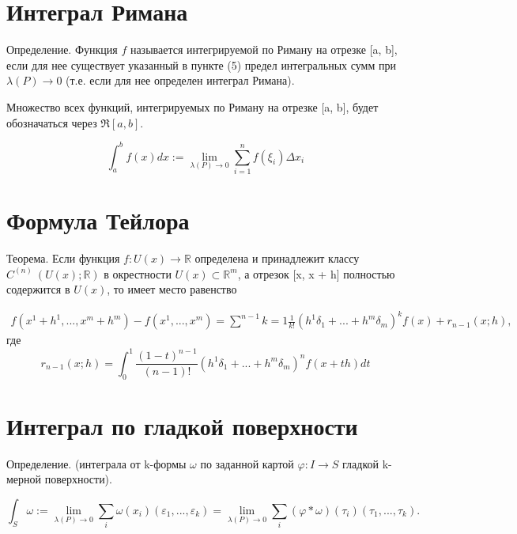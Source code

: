 \documentclass[a4paper, 12pt]{extarticle} %
\begin{document}
\clearpage

\section*{Интеграл Римана}

Определение. Функция $f$ называется интегрируемой по Риману на отрезке [a, b], если для нее существует указанный в пункте (5) предел интегральных сумм при $\lambda (P) \to 0$ (т.е. если для нее определен интеграл Римана).

Множество всех функций, интегрируемых по Риману на отрезке [a, b], будет обозначаться через $\Re [a, b]$.

\begin{equation*}
    \int^b_a f(x) dx := \lim_{\lambda(P) \to 0} \sum^n_{i = 1} f(\xi_i) \Delta x_i
\end{equation*}

\clearpage

\section*{Формула Тейлора}

Теорема. Если функция $f: U(x) \to \mathbb{R}$ определена и принадлежит классу $C^{(n)} \ (U(x); \mathbb{R})$ в окрестности $U(x) \subset \mathbb{R}^m$, а отрезок [x, x + h] полностью содержится в $U(x)$, то имеет место равенство

\begin{eqnarray*}
    f(x^1 + h^1, ..., x^m+h^m) - f(x^1, ...,x^m) = \sum^{n - 1}{k = 1} \frac{1}{k!} (h^1 \delta_1 + ... + h^m \delta_m)^k f(x) + r_{n - 1}(x; h),
\end{eqnarray*}
где
\begin{equation*}
    r_{n-1}(x;h) = \int^1_0 \frac{(1-t)^{n - 1}}{(n - 1)!} (h^1 \delta_1 + ... + h^m \delta_m)^n f(x + th) dt
\end{equation*}

\clearpage
\section*{Интеграл по гладкой поверхности}
Определение. (интеграла от k-формы $\omega$ по заданной картой $\varphi: I \to S$ гладкой k-мерной поверхности).

\begin{equation}
    \int_S \omega := \lim_{\lambda (P) \to 0} \sum_i \omega (x_i)(\varepsilon_1, ..., \varepsilon_k) = \lim_{\lambda(P) \to 0} \sum_i (\varphi * \omega)(\tau_i)(\tau_1, ..., \tau_k).
\end{equation}
\end{document}

